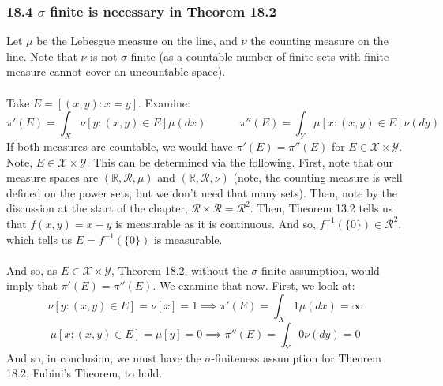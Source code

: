 \documentclass[12pt,a4paper]{article}
\newcommand{\1}[1]{\mathbbm{1}\left\{ #1 \right\}}
\newcommand{\R}{\mathbb{R}}
\newcommand{\rcal}{\mathcal{R}}
\newcommand{\xcal}{\mathcal{X}}
\newcommand{\ycal}{\mathcal{Y}}
\begin{document}
\subsubsection{18.4 $\sigma$ finite is necessary in Theorem 18.2} Let $\mu$ be the Lebesgue measure on the line, and $\nu$ the counting measure on the line. Note that $\nu$ is not $\sigma$ finite (as a countable number of finite sets with finite measure cannot cover an uncountable space).
\\\\
Take $E = \left[(x,y) : x = y\right]$. Examine:
$$
	\pi'(E) = \int_X \nu\left[y : (x,y) \in E\right] \mu(dx) \quad\quad\quad
	\pi''(E) = \int_Y \mu\left[x : (x,y) \in E\right] \nu(dy)
$$
If both measures are countable, we would have $\pi'(E) = \pi''(E)$ for $E \in \xcal \times \ycal$. Note, $E \in \xcal \times \ycal$. This can be determined via the following. First, note that our measure spaces are $(\R, \rcal, \mu)$ and $(\R, \rcal, \nu)$ (note, the counting measure is well defined on the power sets, but we don't need that many sets). Then, note by the discussion at the start of the chapter, $\rcal \times \rcal = \rcal^2$. Then, Theorem 13.2 tells us that $f(x,y) = x - y$ is measurable as it is continuous. And so, $f^{-1}(\{0\}) \in \rcal^2$, which tells us $E = f^{-1}(\{0\})$ is measurable.
\\\\
And so, as $E \in \xcal \times \ycal$, Theorem 18.2, without the $\sigma$-finite assumption, would imply that $\pi'(E) = \pi''(E)$. We examine that now. First, we look at:
$$
	\nu\left[y : (x,y) \in E\right] = \nu\left[x\right] = 1 \implies
	\pi'(E) = \int_X 1 \mu(dx) = \infty
$$ 
$$
	\mu\left[x : (x,y) \in E\right] = \mu\left[y\right] = 0 \implies
	\pi''(E) = \int_Y 0 \nu(dy) = 0
$$
And so, in conclusion, we  must have the $\sigma$-finiteness assumption for Theorem 18.2, Fubini's Theorem, to hold.
\end{document}
